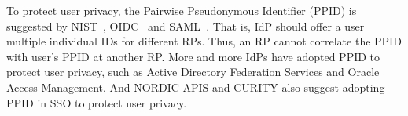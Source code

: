 

To protect user privacy, the Pairwise Pseudonymous Identifier (PPID) is suggested by NIST~\cite{NIST2017draft}, OIDC~\cite{OpenIDConnect} and SAML~\cite{SAMLIdentifier}.
That is, IdP should offer a user multiple individual IDs for different RPs. 
Thus, an RP cannot  correlate the  PPID  with user's PPID at another RP. 
More and more IdPs have adopted PPID to protect user privacy, such as Active Directory Federation Services and Oracle Access Management.
And NORDIC APIS and CURITY also suggest adopting PPID in SSO to protect user privacy.

